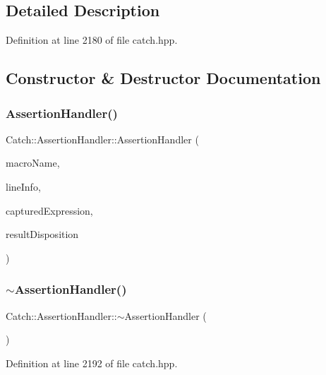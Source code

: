 \subsection{Detailed Description}


Definition at line 2180 of file catch.\+hpp.



\subsection{Constructor \& Destructor Documentation}
\mbox{\label{class_catch_1_1_assertion_handler_a32efbb1b56b71d758d4c2094bac1f1a9}} 
\subsubsection{AssertionHandler()}
{\footnotesize\ttfamily Catch\+::\+Assertion\+Handler\+::\+Assertion\+Handler (\begin{DoxyParamCaption}\item[{\textbf{ String\+Ref} const \&}]{macro\+Name,  }\item[{\textbf{ Source\+Line\+Info} const \&}]{line\+Info,  }\item[{\textbf{ String\+Ref}}]{captured\+Expression,  }\item[{\textbf{ Result\+Disposition\+::\+Flags}}]{result\+Disposition }\end{DoxyParamCaption})}

\mbox{\label{class_catch_1_1_assertion_handler_a1e839d810f6ac0fa6d127fe8350175ed}} 
\subsubsection{$\sim$AssertionHandler()}
{\footnotesize\ttfamily Catch\+::\+Assertion\+Handler\+::$\sim$\+Assertion\+Handler (\begin{DoxyParamCaption}{ }\end{DoxyParamCaption})\hspace{0.3cm}{\ttfamily [inline]}}



Definition at line 2192 of file catch.\+hpp.



